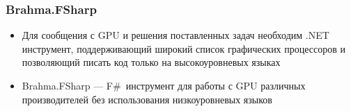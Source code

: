 \documentclass[aspectratio=169]{beamer}
\begin{document}
\begin{frame}
  \frametitle{Brahma.FSharp}
    \begin{itemize}
        \item Для сообщения с GPU и решения поставленных задач  необходим .NET инструмент, поддерживающий широкий список графических процессоров и позволяющий писать код только на высокоуровневых языках
        \item  Brahma.FSharp --- F\#~инструмент для работы с GPU различных производителей без использования низкоуровневых языков
    \end{itemize}
\end{frame}
\end{document}
